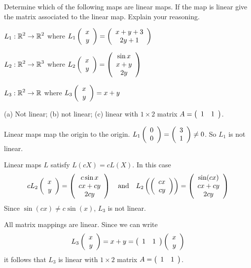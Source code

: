 \documentclass{article}
\begin{document}
\begin{exercise}\label{c4.3.6A}

Determine which of the following maps are linear maps.  If the map is linear give the matrix associated to the linear map. Explain your reasoning.
\begin{enumeratea}

\item $L_1:\R^2\to\R^2$ where $L_1\Matrix{x\\y} = \Matrixc{x + y+ 3\\ 2y +1}$

\item $L_2:\R^2\to\R^3$ where $L_2\Matrix{x\\y} = \Matrixc{\sin x\\ x + y\\ 2y}$
 
\item $L_3:\R^2\to\R$ where $L_3\Matrix{x\\y} = x + y $
  
\end{enumeratea}
  
\begin{solution}

\ans (a) Not linear; (b) not linear; (c) linear with $1\times 2$ matrix $A= \Matrix{1 & 1}$.

\soln 
\begin{enumeratea}

\item Linear maps map the origin to the origin.  $L_1\Matrix{0\\0} = \Matrix{3\\1} \neq 0$. So $L_1$ is not linear.

\item Linear maps $L$ satisfy $L(cX) = cL(X)$.  In this case 
\[
cL_2\Matrix{x\\y} =  \Matrixc{c\sin x\\ cx + cy\\ 2cy} \AND
L_2\left(\Matrix{cx\\cy}\right) =  \Matrixc{\sin(cx)\\ cx + cy\\ 2cy}
\]
Since $\sin(cx)\neq c\sin(x)$, $L_3$ is not linear.

\item All matrix mappings are linear.  Since we can write
\[
L_3 \Matrix{x\\y} = x+ y = \Matrix{1 &1} \Matrix{x\\y}  
\]
it follows that $L_3$ is linear with $1\times 2$ matrix $A =  \Matrix{1 &1}$.
\end{enumeratea}


\end{solution}
\end{exercise}
\end{document}
